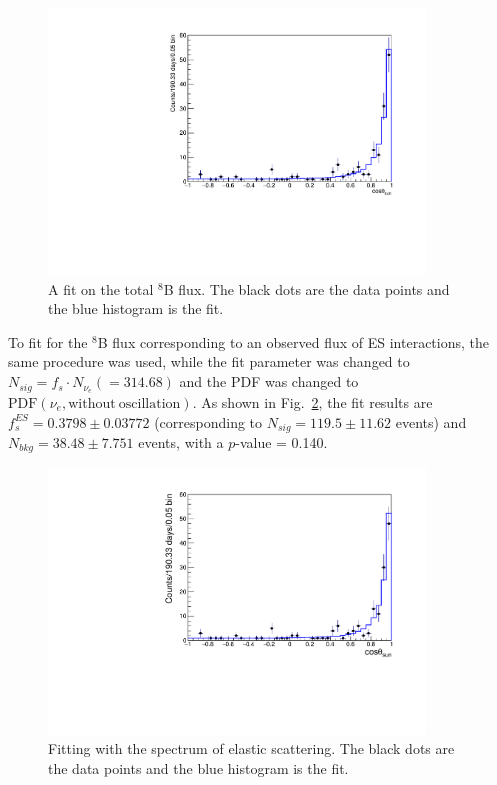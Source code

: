{\begin{figure}[!htb]
	\centering
	\includegraphics[width=10cm]{TotalFluxFitMLP.pdf}
	\caption[A fit on the total $^8$B flux.]{A fit on the total $^8$B flux. The black dots are the data points and the blue histogram is the fit.\label{fig:TOTALfluxFit}}
\end{figure}

To fit for the $^8$B flux corresponding to an observed flux of ES interactions, the same procedure was used, while the fit parameter was changed to $N_{sig}=f_s\cdot N_{\nu_e}(=314.68)$ and the PDF was changed to $\mathrm{PDF}(\nu_e,\mathrm{without~oscillation})$. As shown in Fig.~\ref{fig:ESfluxFit}, the fit results are $f^{ES}_s=0.3798\pm 0.03772$ (corresponding to $N_{sig}=119.5\pm11.62$ events) and $N_{bkg}=38.48\pm 7.751$ events, with a $p$-value = 0.140.

\begin{figure}[!htb]
	\centering
	\includegraphics[width=10cm]{ESfluxFit.pdf}
	\caption[Fitting with the spectrum of elastic scattering.]{Fitting with the spectrum of elastic scattering. The black dots are the data points and the blue histogram is the fit.\label{fig:ESfluxFit}}
\end{figure}

}
